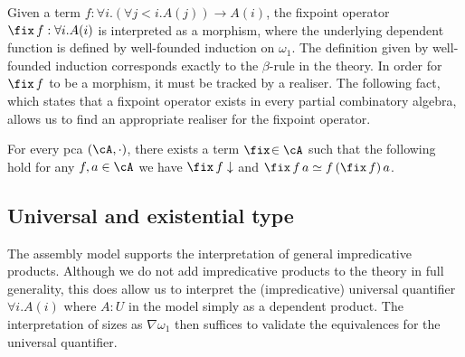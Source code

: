 %

Given a term \( f : \forall i. (\forall j < i. A(j)) \to A(i) \), the fixpoint operator \( \fix \, f : \forall i . A(i) \) is interpreted as a morphism, where the underlying dependent function is defined by well-founded induction on \( \omega_1 \). The definition given by well-founded induction corresponds exactly to the \( \beta \)-rule in the theory. In order for \( \fix \, f \) to be a morphism, it must be tracked by a realiser. The following fact, which states that a fixpoint operator exists in every partial combinatory algebra, allows us to find an appropriate realiser for the fixpoint operator.
\begin{proposition}
    For every pca $(\cA, \cdot)$, there exists a term $\fix\! \in \cA$ such that the following hold for any \( f, a \in \cA \) we have $\fix\,f \downarrow$ and $\fix\,f \, a \simeq f \, (\fix\,f) \, a$.
\end{proposition}


\subsection{Universal and existential type}
The assembly model supports the interpretation of general impredicative products. Although we do not add impredicative products to the theory in full generality, this does allow us to interpret the (impredicative) universal quantifier $\forall i . A(i)$ where $A : U$ in the model simply as a dependent product. The interpretation of sizes as $\nabla \omega_1$ then suffices to validate the equivalences for the universal quantifier.

